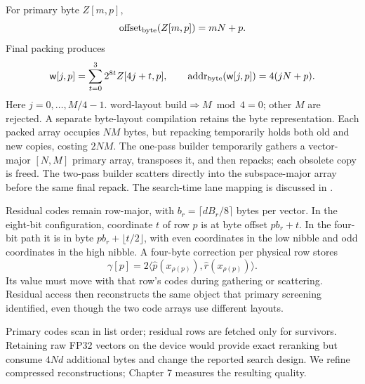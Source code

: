 For primary byte $Z[m,p]$,
\[
 \operatorname{offset}_{\rm byte}(Z[m,p])=mN+p.
\] Final packing produces
\begin{equation}
 \mathsf w[j,p]=\sum_{t=0}^{3}2^{8t}Z[4j+t,p],\qquad
 \operatorname{addr}_{\rm byte}(\mathsf w[j,p])=4(jN+p).
 \label{eq:4-primary-address}
\end{equation}
Here $j=0,\ldots,M/4-1$. $\text{word-layout build}\Longrightarrow M\bmod4=0$; other $M$ are rejected. A separate byte-layout compilation
retains the byte representation. Each packed array occupies $NM$ bytes,
but repacking temporarily holds both old and new copies, costing $2NM$.
The one-pass builder
temporarily gathers a vector-major $[N,M]$ primary array, transposes it, and
then repacks; each obsolete copy is freed. The two-pass builder scatters
directly into the subspace-major array before the same final repack.
The search-time lane mapping is discussed in .

Residual codes remain row-major, with
$b_r=\lceil dB_r/8\rceil$ bytes per vector. In the eight-bit configuration,
coordinate $t$ of row $p$ is at byte offset $pb_r+t$. In the four-bit
path it is in byte $pb_r+\lfloor t/2\rfloor$, with even coordinates
in the low nibble and odd coordinates in the high nibble. A four-byte
correction per physical row stores
\begin{equation}
 \gamma[ p ]=2\langle\widehat p(x_{\rho(p)}),
                              \widehat r(x_{\rho(p)})\rangle.
 \label{eq:4-correction}
\end{equation}
Its value must move with that row's codes during gathering or scattering.
Residual access then reconstructs the same object that primary screening
identified, even though the two code arrays use different layouts.

Primary codes scan in list order; residual rows are fetched only for survivors. Retaining raw FP32 vectors on the device would
provide exact reranking but consume $4Nd$ additional bytes and change the
reported search design. We refine compressed reconstructions; Chapter 7 measures the resulting quality.
